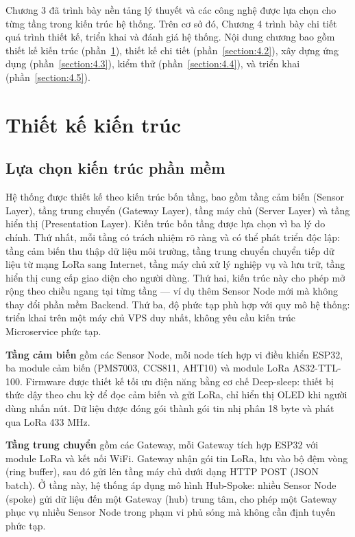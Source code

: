 \documentclass[../DoAn.tex]{subfiles}
\begin{document}
Chương 3 đã trình bày nền tảng lý thuyết và các công nghệ được lựa chọn cho từng tầng trong kiến trúc hệ thống. Trên cơ sở đó, Chương 4 trình bày chi tiết quá trình thiết kế, triển khai và đánh giá hệ thống. Nội dung chương bao gồm thiết kế kiến trúc (phần~\ref{section:4.1}), thiết kế chi tiết (phần~\ref{section:4.2}), xây dựng ứng dụng (phần~\ref{section:4.3}), kiểm thử (phần~\ref{section:4.4}), và triển khai (phần~\ref{section:4.5}).

\section{Thiết kế kiến trúc}
\label{section:4.1}

\subsection{Lựa chọn kiến trúc phần mềm}
\label{subsection:4.1.1}

Hệ thống được thiết kế theo kiến trúc bốn tầng, bao gồm tầng cảm biến (Sensor Layer), tầng trung chuyển (Gateway Layer), tầng máy chủ (Server Layer) và tầng hiển thị (Presentation Layer). Kiến trúc bốn tầng được lựa chọn vì ba lý do chính. Thứ nhất, mỗi tầng có trách nhiệm rõ ràng và có thể phát triển độc lập: tầng cảm biến thu thập dữ liệu môi trường, tầng trung chuyển chuyển tiếp dữ liệu từ mạng \gls{LoRa} sang Internet, tầng máy chủ xử lý nghiệp vụ và lưu trữ, tầng hiển thị cung cấp giao diện cho người dùng. Thứ hai, kiến trúc này cho phép mở rộng theo chiều ngang tại từng tầng — ví dụ thêm Sensor Node mới mà không thay đổi phần mềm Backend. Thứ ba, độ phức tạp phù hợp với quy mô hệ thống: triển khai trên một máy chủ VPS duy nhất, không yêu cầu kiến trúc Microservice phức tạp.

\textbf{Tầng cảm biến} gồm các Sensor Node, mỗi node tích hợp vi điều khiển ESP32, ba module cảm biến (PMS7003, CCS811, AHT10) và module \gls{LoRa} AS32-TTL-100. Firmware được thiết kế tối ưu điện năng bằng cơ chế Deep-sleep: thiết bị thức dậy theo chu kỳ để đọc cảm biến và gửi LoRa, chỉ hiển thị OLED khi người dùng nhấn nút. Dữ liệu được đóng gói thành gói tin nhị phân 18 byte và phát qua \gls{LoRa} 433 MHz.

\textbf{Tầng trung chuyển} gồm các Gateway, mỗi Gateway tích hợp ESP32 với module \gls{LoRa} và kết nối WiFi. Gateway nhận gói tin \gls{LoRa}, lưu vào bộ đệm vòng (ring buffer), sau đó gửi lên tầng máy chủ dưới dạng \gls{HTTP} POST (\gls{JSON} batch). Ở tầng này, hệ thống áp dụng mô hình Hub-Spoke: nhiều Sensor Node (spoke) gửi dữ liệu đến một Gateway (hub) trung tâm, cho phép một Gateway phục vụ nhiều Sensor Node trong phạm vi phủ sóng mà không cần định tuyến phức tạp.
\end{document}
